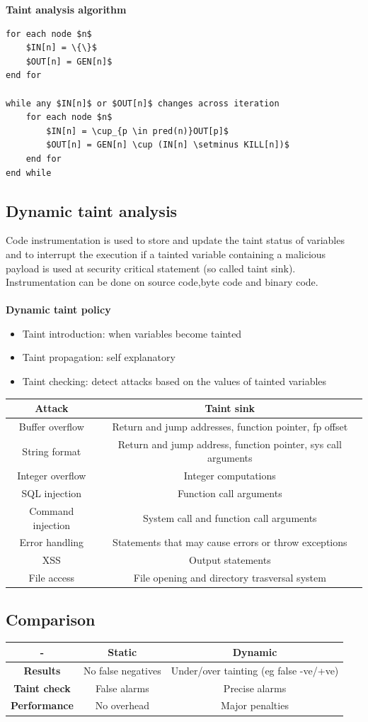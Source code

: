 \documentclass[10pt,a4paper]{article}
\begin{document}
\textbf{Taint analysis algorithm}
\begin{lstlisting}[frame=lines]
for each node $n$
	$IN[n] = \{\}$
	$OUT[n] = GEN[n]$
end for

while any $IN[n]$ or $OUT[n]$ changes across iteration
	for each node $n$
		$IN[n] = \cup_{p \in pred(n)}OUT[p]$
		$OUT[n] = GEN[n] \cup (IN[n] \setminus KILL[n])$
	end for
end while
\end{lstlisting}
\subsection{Dynamic taint analysis}
Code instrumentation is used to store and update the taint status of variables and to interrupt the execution if a tainted variable containing a malicious payload is used at security critical statement (so called taint sink).\\
Instrumentation can be done on source code,byte code and binary code.\\\\
\textbf{Dynamic taint policy}
\begin{itemize}
\item Taint introduction: when variables become tainted
\item Taint propagation: self explanatory
\item Taint checking: detect attacks based on the values of tainted variables
\end{itemize}
\begin{tabular}{|c|c|}
\hline 
{\bf Attac}k & {\bf Taint sink} \\ 
\hline 
Buffer overflow & Return and jump addresses, function pointer, fp offset \\ 
\hline 
String format & Return and jump address, function pointer, sys call arguments \\ 
\hline 
Integer overflow & Integer computations \\ 
\hline 
SQL injection & Function call arguments \\ 
\hline 
Command injection & System call and function call arguments \\ 
\hline 
Error handling & Statements that may cause errors or throw exceptions \\ 
\hline 
XSS & Output statements \\ 
\hline 
File access & File opening and directory trasversal system \\ 
\hline 
\end{tabular} 
\subsection{Comparison}
\begin{tabular}{|c|c|c|}
\hline 
- & {\bf Static} & {\bf Dynamic} \\ 
\hline 
{\bf Results} & No false negatives & Under/over tainting (eg false -ve/+ve) \\ 
\hline 
{\bf Taint check} & False alarms & Precise alarms \\ 
\hline 
{\bf Performance} & No overhead & Major penalties \\ 
\hline 
\end{tabular} 
\newpage
\end{document}
